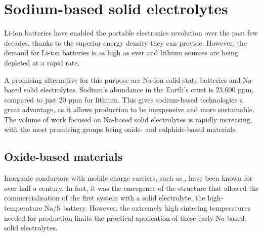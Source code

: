 \documentclass[12pt]{report}
\begin{document}
\section{Sodium-based solid electrolytes}

Li-ion batteries have enabled the portable electronics revolution over the past few decades, thanks to the superior energy density they can provide.\cite{goodenough2013, thackeray2012} 
However, the demand for Li-ion batteries is as high as ever and lithium sources are being depleted at a rapid rate.

A promising alternative for this purpose are Na-ion solid-state batteries and Na-based solid electrolytes.\cite{zhang2018b, zhao2018, kim2017, ren2017, guin2015, islam2014, ellis2012}
Sodium's abundance in the Earth's crust is 23,600 ppm, compared to just 20 ppm for lithium. \cite{haynes2016} 
This gives sodium-based technologies a great advantage, as it allows production to be inexpensive and more sustainable.
The volume of work focused on Na-based solid electrolytes is rapidly increasing, with the most promising groups being oxide- and sulphide-based materials.

\subsection{Oxide-based materials}

Inorganic conductors with mobile  charge carriers, such as , have been known for over half a century.
In fact, it was the emergence of the  structure that allowed the commercialisation of the first system with a solid electrolyte, the high-temperature Na/S battery.\cite{yao1967}
However, the extremely high sintering temperatures needed for production limits the practical application of these early Na-based solid electrolytes. \cite{hueso2013}
\end{document}
